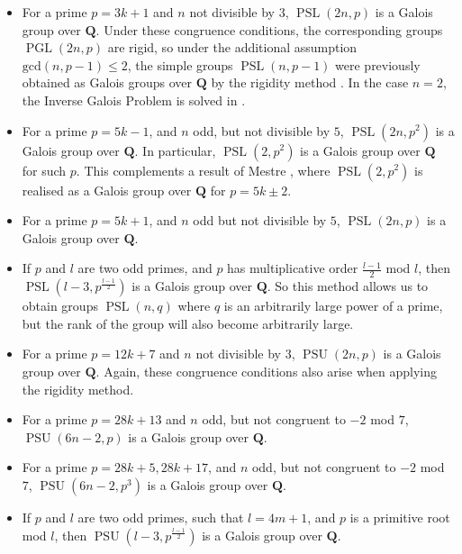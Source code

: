 \documentclass{article}
\theoremstyle{definition}
\DeclareMathOperator{\PGL}{\mathrm{PGL}}
\DeclareMathOperator{\PSL}{\mathrm{PSL}}
\DeclareMathOperator{\PSU}{\mathrm{PSU}}
\begin{document}
	\begin{itemize}
		\item For a prime $p = 3k + 1$ and $n$ not divisible by $3$, $\PSL(2n,p)$ is a Galois group over $\mathbf{Q}$. Under these congruence conditions, the corresponding groups $\PGL(2n,p)$ are rigid, so under the additional assumption $\mathrm{gcd}(n, p - 1) \le 2$, the simple groups $\PSL(n, p-1)$ were previously obtained as Galois groups over $\mathbf{Q}$ by the rigidity method \cite[Theorem III.10.3]{malle}. In the case $n=2$, the Inverse Galois Problem is solved in \cite{zywina}.
		\item For a prime $p = 5k-1$, and $n$ odd, but not divisible by $5$, $\PSL(2n, p^2)$ is a Galois group over $\mathbf{Q}$. In particular, $\PSL(2, p^2)$ is a Galois group over $\mathbf{Q}$ for such $p$. This complements a result of Mestre \cite{mestre}, where $\PSL(2, p^2)$ is realised as a Galois group over $\mathbf{Q}$ for $p = 5k \pm 2$.
		\item For a prime $p = 5k + 1$, and $n$ odd but not divisible by $5$, $\PSL(2n, p)$ is a Galois group over $\mathbf{Q}$.
		\item If $p$ and $l$ are two odd primes, and $p$ has multiplicative order $\frac{l-1}{2}$ mod $l$, then $\PSL(l-3, p^{\frac{l-1}{2}})$ is a Galois group over $\mathbf{Q}$. So this method allows us to obtain groups $\PSL(n,q)$ where $q$ is an arbitrarily large power of a prime, but the rank of the group will also become arbitrarily large.
		\item For a prime $p = 12k +7$ and $n$ not divisible by $3$, $\PSU(2n ,p)$ is a Galois group over $\mathbf{Q}$. Again, these congruence conditions also arise when applying the rigidity method.  \cite[Theorem III.10.3]{malle}
		\item For a prime $p=28k+13$ and $n$ odd, but not congruent to $-2$ mod $7$, $\PSU(6n-2 ,p)$ is a Galois group over $\mathbf{Q}$. 
		\item For a prime $p = 28k+5, 28k+17$, and $n$ odd, but not congruent to $-2$ mod $7$, $\PSU(6n-2 ,p^3)$ is a Galois group over $\mathbf{Q}$.
		\item If $p$ and $l$ are two odd primes, such that $l = 4m+1$, and $p$ is a primitive root mod $l$, then $\PSU(l-3, p^{\frac{l-1}{2}})$ is a Galois group over $\mathbf{Q}$.
	\end{itemize}
\end{document}
